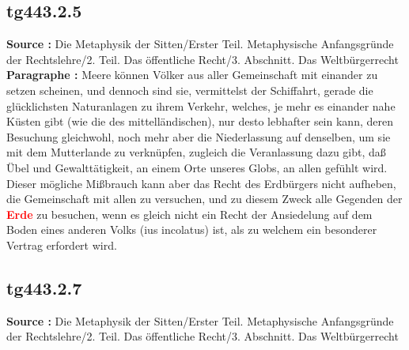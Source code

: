 \documentclass[a4paper,12pt,twoside]{book}
\newcommand{\match}[1]{\textcolor{red}{\textbf{#1}}}
\begin{document}
	\subsection*{tg443.2.5} 
	\textbf{Source : }Die Metaphysik der Sitten/Erster Teil. Metaphysische Anfangsgründe der Rechtslehre/2. Teil. Das öffentliche Recht/3. Abschnitt. Das Weltbürgerrecht\\  
	
	\textbf{Paragraphe : }Meere können Völker aus aller Gemeinschaft mit einander zu setzen scheinen, und dennoch sind sie, vermittelst der Schiffahrt, gerade die glücklichsten Naturanlagen zu ihrem Verkehr, welches, je mehr es einander nahe Küsten gibt (wie die des mittelländischen), nur desto lebhafter sein kann, deren Besuchung gleichwohl, noch mehr aber die Niederlassung auf denselben, um sie mit dem Mutterlande zu verknüpfen, zugleich die Veranlassung dazu gibt, daß Übel und Gewalttätigkeit, an einem Orte unseres Globs, an allen gefühlt wird. Dieser mögliche Mißbrauch kann aber das Recht des Erdbürgers nicht aufheben, die Gemeinschaft mit allen zu versuchen, und zu diesem Zweck alle Gegenden der \match{Erde} zu besuchen, wenn es gleich nicht ein Recht der Ansiedelung auf dem Boden eines anderen Volks (ius incolatus) ist, als zu welchem ein besonderer Vertrag erfordert wird. 
	
	\subsection*{tg443.2.7} 
	\textbf{Source : }Die Metaphysik der Sitten/Erster Teil. Metaphysische Anfangsgründe der Rechtslehre/2. Teil. Das öffentliche Recht/3. Abschnitt. Das Weltbürgerrecht\\  
	
\end{document}
